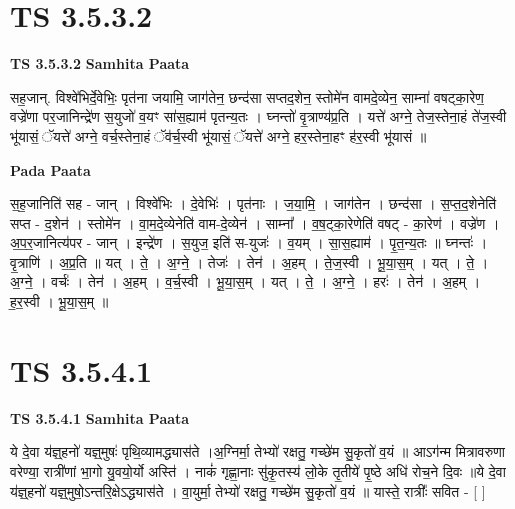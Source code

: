 \documentclass[17pt]{extarticle}
\begin{document}

\section{ TS 3.5.3.2 }

\textbf{TS 3.5.3.2 } \newline
\textbf{Samhita Paata} \newline

सह॒जान्. विश्वे॑भिर्दे॒वेभिः॒ पृत॑ना जयामि॒ जाग॑तेन॒ छन्द॑सा सप्तद॒शेन॒ स्तोमे॑न वामदे॒व्येन॒ साम्ना॑ वषट्का॒रेण॒ वज्रे॑णा पर॒जानिन्द्रे॑ण स॒युजो॑ व॒यꣳ सा॑स॒ह्याम॑ पृतन्य॒तः । घ्नन्तो॑ वृ॒त्राण्य॑प्र॒ति । यत्ते॑ अग्ने॒ तेज॒स्तेना॒हं ते॑ज॒स्वी भू॑यासं॒ ॅयत्ते॑ अग्ने॒ वर्च॒स्तेना॒हं ॅव॑र्च॒स्वी भू॑यासं॒ ॅयत्ते॑ अग्ने॒ हर॒स्तेना॒हꣳ ह॑र॒स्वी भू॑यासं ॥ \newline

\textbf{Pada Paata} \newline

स॒ह॒जानिति॑ सह - जान् । विश्वे॑भिः । दे॒वेभिः॑ । पृत॑नाः । ज॒या॒मि॒ । जाग॑तेन । छन्द॑सा । स॒प्त॒द॒शेनेति॑ सप्त - द॒शेन॑ । स्तोमे॑न । वा॒म॒दे॒व्येनेति॑ वाम-दे॒व्येन॑ । साम्ना᳚ । व॒ष॒ट्का॒रेणेति॑ वषट् - का॒रेण॑ । वज्रे॑ण । अ॒प॒र॒जानित्य॑पर - जान् । इन्द्रे॑ण । स॒युज॒ इति॑ स-युजः॑ । व॒यम् । सा॒स॒ह्याम॑ । पृ॒त॒न्य॒तः ॥ घ्नन्तः॑ । वृ॒त्राणि॑ । अ॒प्र॒ति ॥ यत् । ते॒ । अ॒ग्ने॒ । तेजः॑ । तेन॑ । अ॒हम् । ते॒ज॒स्वी । भू॒या॒स॒म् । यत् । ते॒ । अ॒ग्ने॒ । वर्चः॑ । तेन॑ । अ॒हम् । व॒र्च॒स्वी । भू॒या॒स॒म् । यत् । ते॒ । अ॒ग्ने॒ । हरः॑ । तेन॑ । अ॒हम् । ह॒र॒स्वी । भू॒या॒स॒म् ॥  \newline





\section{ TS 3.5.4.1 }

\textbf{TS 3.5.4.1 } \newline
\textbf{Samhita Paata} \newline

ये दे॒वा य॑ज्ञ्॒हनो॑ यज्ञ्॒मुषः॑ पृथि॒व्यामद्ध्यास॑ते ।अ॒ग्निर्मा॒ तेभ्यो॑ रक्षतु॒ गच्छे॑म सु॒कृतो॑ व॒यं ॥ आऽग॑न्म मित्रावरुणा वरेण्या॒ रात्री॑णां भा॒गो यु॒वयो॒र्यो अस्ति॑ । नाकं॑ गृह्णा॒नाः सु॑कृ॒तस्य॑ लो॒के तृ॒तीये॑ पृ॒ष्ठे अधि॑ रोच॒ने दि॒वः ॥ये दे॒वा य॑ज्ञ्॒हनो॑ यज्ञ्॒मुषो॒ऽन्तरि॒क्षेऽद्ध्यास॑ते । वा॒युर्मा॒ तेभ्यो॑ रक्षतु॒ गच्छे॑म सु॒कृतो॑ व॒यं ॥ यास्ते॒ रात्रीः᳚ सवित - [  ] \newline
\end{document}
